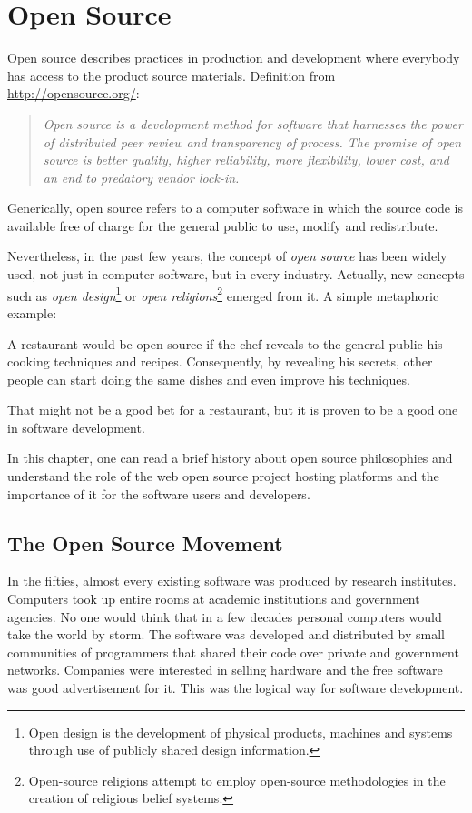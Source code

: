 \thispagestyle{empty}
\chapter{Open Source}\label{chap:open_source}


 
Open source describes practices in production and development where everybody has access to the product source materials.
Definition from \url{http://opensource.org/}:
\begin{quote}\emph{
  Open source is a development method for software that harnesses the power of distributed peer review and transparency of process.
  The promise of open source is better quality, higher reliability, more flexibility, lower cost, 
  and an end to predatory vendor lock-in.
}\end{quote}

Generically, open source refers to a computer software in which the source code is available free of charge for the general public to use, modify and redistribute.

Nevertheless, in the past few years, the concept of \emph{open source} 
has been widely used, not just in computer software, but in every industry.
Actually, new concepts such as 
\emph{open design}\footnote{
  Open design is the development of physical products, machines and systems through use of publicly shared design information.
} or 
\emph{open religions}\footnote{
  Open-source religions attempt to employ open-source methodologies in the creation of religious belief systems.
}
emerged from it.
A simple metaphoric example: 

A restaurant would be open source if the chef reveals to the general public his cooking techniques and recipes.
Consequently, by revealing his secrets, other people can start doing the same dishes and even improve his techniques.

That might not be a good bet for a restaurant, but it is proven to be a good one in software development.

In this chapter, one can read a brief history about open source philosophies and understand the role of the web open source project hosting platforms
and the importance of it for the software users and developers.


\section{The Open Source Movement}

In the fifties, almost every existing software was produced by research institutes. 
Computers took up entire rooms at academic institutions and government agencies.
No one would think that in a few decades personal computers would take the world by storm.
The software was developed and distributed by small communities of
programmers that shared their code over private and government networks.
Companies were interested in selling hardware and the free software was good advertisement for it.
This was the logical way for software development.

